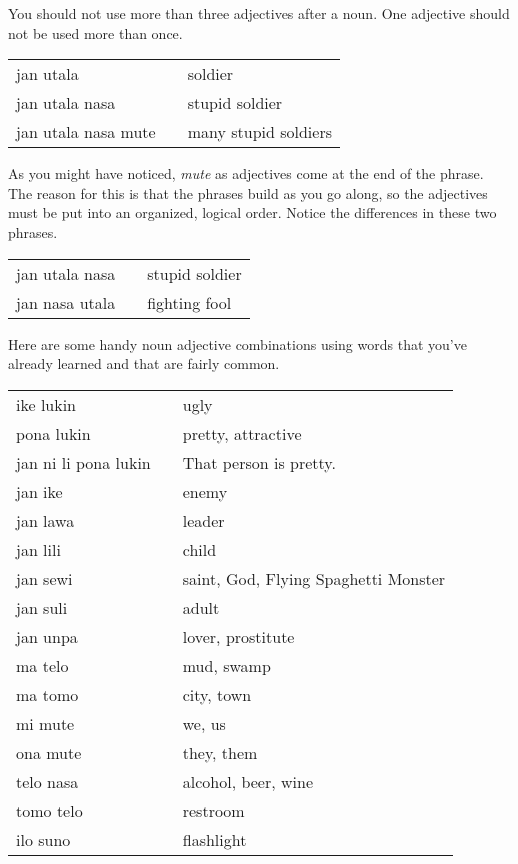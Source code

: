 You should not use more than three adjectives after a noun. 
One adjective should not be used more than once.

\begin{supertabular}{p{5,5cm}|ll}
jan utala && soldier  \\
jan utala nasa && stupid soldier  \\
jan utala nasa mute && many stupid soldiers  \\
\end{supertabular} 

As you might have noticed, \textit{mute} as adjectives come at the end of the phrase. 
The reason for this is that the phrases build as you go along, so the adjectives must be put into an organized, logical order. 
Notice the differences in these two phrases.

\begin{supertabular}{p{5,5cm}|ll}
jan utala nasa && stupid soldier  \\
jan nasa utala && fighting fool \\
\end{supertabular}

Here are some handy noun adjective combinations using words that you've already learned and that are fairly common.

\begin{supertabular}{p{5,5cm}|ll}
ike lukin && ugly  \\
pona lukin && pretty, attractive \\
jan ni li pona lukin && That person is pretty. \\
jan ike && enemy \\
jan lawa && leader \\
jan lili && child \\
jan sewi && saint, God, Flying Spaghetti Monster \\
jan suli && adult \\
jan unpa && lover, prostitute \\
ma telo && mud, swamp \\
ma tomo && city, town \\
mi mute && we, us \\
ona mute && they, them \\
telo nasa && alcohol, beer, wine \\
tomo telo && restroom \\
ilo suno && flashlight \\ 
\end{supertabular} 

